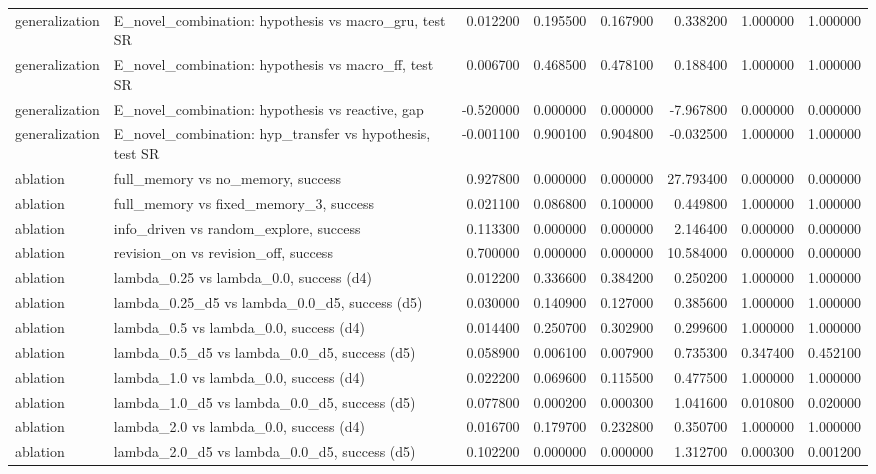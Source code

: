 \begin{tabular}{llrrrrrr}
generalization & E\_novel\_combination: hypothesis vs macro\_gru, test SR & 0.012200 & 0.195500 & 0.167900 & 0.338200 & 1.000000 & 1.000000 \\
generalization & E\_novel\_combination: hypothesis vs macro\_ff, test SR & 0.006700 & 0.468500 & 0.478100 & 0.188400 & 1.000000 & 1.000000 \\
generalization & E\_novel\_combination: hypothesis vs reactive, gap & -0.520000 & 0.000000 & 0.000000 & -7.967800 & 0.000000 & 0.000000 \\
generalization & E\_novel\_combination: hyp\_transfer vs hypothesis, test SR & -0.001100 & 0.900100 & 0.904800 & -0.032500 & 1.000000 & 1.000000 \\
ablation & full\_memory vs no\_memory, success & 0.927800 & 0.000000 & 0.000000 & 27.793400 & 0.000000 & 0.000000 \\
ablation & full\_memory vs fixed\_memory\_3, success & 0.021100 & 0.086800 & 0.100000 & 0.449800 & 1.000000 & 1.000000 \\
ablation & info\_driven vs random\_explore, success & 0.113300 & 0.000000 & 0.000000 & 2.146400 & 0.000000 & 0.000000 \\
ablation & revision\_on vs revision\_off, success & 0.700000 & 0.000000 & 0.000000 & 10.584000 & 0.000000 & 0.000000 \\
ablation & lambda\_0.25 vs lambda\_0.0, success (d4) & 0.012200 & 0.336600 & 0.384200 & 0.250200 & 1.000000 & 1.000000 \\
ablation & lambda\_0.25\_d5 vs lambda\_0.0\_d5, success (d5) & 0.030000 & 0.140900 & 0.127000 & 0.385600 & 1.000000 & 1.000000 \\
ablation & lambda\_0.5 vs lambda\_0.0, success (d4) & 0.014400 & 0.250700 & 0.302900 & 0.299600 & 1.000000 & 1.000000 \\
ablation & lambda\_0.5\_d5 vs lambda\_0.0\_d5, success (d5) & 0.058900 & 0.006100 & 0.007900 & 0.735300 & 0.347400 & 0.452100 \\
ablation & lambda\_1.0 vs lambda\_0.0, success (d4) & 0.022200 & 0.069600 & 0.115500 & 0.477500 & 1.000000 & 1.000000 \\
ablation & lambda\_1.0\_d5 vs lambda\_0.0\_d5, success (d5) & 0.077800 & 0.000200 & 0.000300 & 1.041600 & 0.010800 & 0.020000 \\
ablation & lambda\_2.0 vs lambda\_0.0, success (d4) & 0.016700 & 0.179700 & 0.232800 & 0.350700 & 1.000000 & 1.000000 \\
ablation & lambda\_2.0\_d5 vs lambda\_0.0\_d5, success (d5) & 0.102200 & 0.000000 & 0.000000 & 1.312700 & 0.000300 & 0.001200 \\

\end{tabular}
